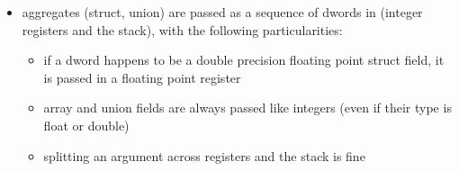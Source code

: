 \begin{itemize}
\item aggregates (struct, union) are passed as a sequence of dwords in (integer registers and the stack), with the following particularities:
\begin{itemize}
\item if a dword happens to be a double precision floating point struct field, it is passed in a floating point register
\item array and union fields are always passed like integers (even if their type is float or double)
\item splitting an argument across registers and the stack is fine
\end{itemize}
\end{itemize}


